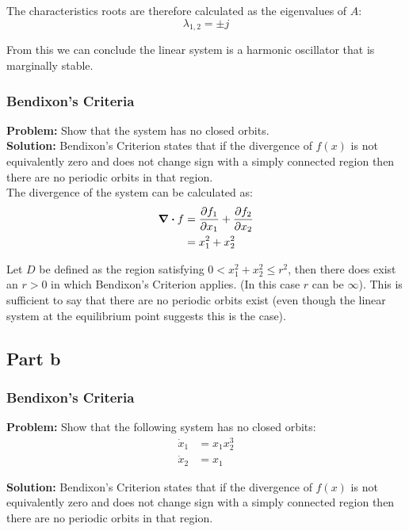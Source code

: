 \documentclass[letter]{article}
\begin{document}
The characteristics roots are therefore calculated as the eigenvalues of $A$:
$$\lambda_{1,2} = \pm j$$

From this we can conclude the linear system is a harmonic oscillator that is marginally stable.

\newpage
\subsubsection{Bendixon's Criteria}
\textbf{Problem:}
Show that the system has no closed orbits.\\

\noindent
\textbf{Solution:}
Bendixon's Criterion states that if the divergence of $f(x)$ is not equivalently zero and does not change sign with a simply connected region then there are no periodic orbits in that region.\\

The divergence of the system can be calculated as:
\begin{align}
	\div f  &= \pdv{f_1}{x_1} + \pdv{f_2}{x_2} \nonumber\\
	&= x_1^2 + x_2^2
\end{align}

Let $D$ be defined as the region satisfying $0 < x_1^2 + x_2^2 \leq r^2$, then there does exist an $r>0$ in which Bendixon's Criterion applies. (In this case $r$ can be $\infty$). This is sufficient to say that there are no periodic orbits exist (even though the linear system at the equilibrium point suggests this is the case).


\subsection{Part b}
\subsubsection{Bendixon's Criteria}
\textbf{Problem:}
Show that the following system has no closed orbits:
\begin{equation}
	\begin{aligned}
		\dot{x}_1 &= x_1 x_2^3\\
		\dot{x}_2 &= x_1
	\end{aligned}
\end{equation}

\noindent
\textbf{Solution:}
Bendixon's Criterion states that if the divergence of $f(x)$ is not equivalently zero and does not change sign with a simply connected region then there are no periodic orbits in that region.\\
\end{document}
